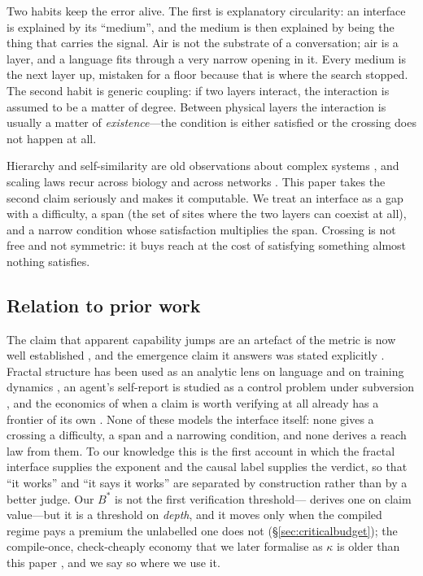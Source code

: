 \documentclass[conference]{IEEEtran}
\theoremstyle{definition}
\begin{document}
Two habits keep the error alive. The first is explanatory circularity: an
interface is explained by its ``medium'', and the medium is then explained by
being the thing that carries the signal. Air is not the substrate of a
conversation; air is a layer, and a language fits through a very narrow opening in
it. Every medium is the next layer up, mistaken for a floor because that is where
the search stopped. The second habit is generic coupling: if two layers interact,
the interaction is assumed to be a matter of degree. Between physical layers the
interaction is usually a matter of \emph{existence}---the condition is either
satisfied or the crossing does not happen at all.

Hierarchy and self-similarity are old observations about complex systems
\cite{simon1962,mandelbrot1982}, and scaling laws recur across biology and across
networks \cite{west1997,barabasi1999}. This paper takes the second claim seriously
and makes it computable. We treat an
interface as a gap with a difficulty, a span (the set of sites where the two layers
can coexist at all), and a narrow condition whose satisfaction multiplies the
span. Crossing is not free and not symmetric: it buys reach at the cost of
satisfying something almost nothing satisfies.

\subsection{Relation to prior work}
\label{sec:related}

The claim that apparent capability jumps are an artefact of the metric is now
well established \cite{schaeffer2023,du2024,zhao2025}, and the emergence claim it
answers was stated explicitly \cite{wei2022}. Fractal structure has been used as
an analytic lens on language and on training dynamics
\cite{alabdulmohsin2025,torkamandi2025}, an agent's self-report is studied as a
control problem under subversion \cite{greenblatt2023,vanderweij2024}, and the
economics of when a claim is worth verifying at all already has a frontier of its
own \cite{gill2026}. None of these models the interface itself: none gives a
crossing a difficulty, a span and a narrowing condition, and none derives a reach
law from them. To our knowledge this is the first account in which the fractal
interface supplies the exponent and the causal label supplies the verdict, so that
``it works'' and ``it says it works'' are separated by construction rather than
by a better judge. Our $B^{*}$ is not the first verification threshold---%
\cite{gill2026} derives one on claim value---but it is a threshold on
\emph{depth}, and it moves only when the compiled regime pays a premium the
unlabelled one does not (\S\ref{sec:criticalbudget}); the compile-once,
check-cheaply economy that we later formalise as $\kappa$ is older than this paper
\cite{necula1997}, and we say so where we use it.
\end{document}
